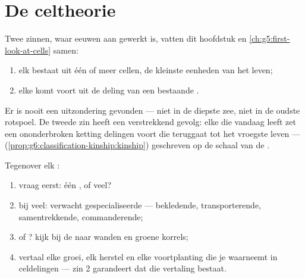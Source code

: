 \section{De celtheorie}

\begin{proposition}[De celtheorie]\label{prop:g6:cell-unit-of-life:theory}
Twee zinnen, waar eeuwen aan gewerkt is, vatten dit hoofdstuk en
\cref{ch:g5:first-look-at-cells} samen:
\begin{enumerate}
  \item elk  bestaat uit één of meer cellen, de kleinste
        eenheden van het leven;
  \item elke  komt voort uit de deling van een bestaande .
\end{enumerate}
Er is nooit een uitzondering gevonden --- niet in de diepste zee, niet in
de oudste rotspoel. De tweede zin heeft een verstrekkend gevolg: elke 
die vandaag leeft zet een ononderbroken ketting delingen voort die
teruggaat tot het vroegste leven --- 
(\cref{prop:g6:classification-kinship:kinship}) geschreven op de schaal
van de .
\end{proposition}
\admitted

\begin{method}\label{met:g6:cell-unit-of-life:read}
Tegenover elk :
\begin{enumerate}
  \item vraag eerst: één , of veel?
  \item bij veel: verwacht gespecialiseerde  --- bekledende,
        transporterende, samentrekkende, commanderende;
  \item {} of ? kijk bij de  naar wanden en groene
        korrels;
  \item vertaal elke groei, elk herstel en elke voortplanting die je
        waarneemt in celdelingen --- zin 2 garandeert dat die vertaling
        bestaat.
\end{enumerate}
\end{method}

